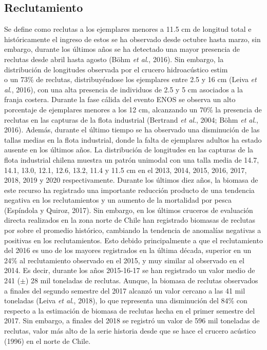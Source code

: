 \documentclass[letter,11pt]{article}
\begin{document}
\subsection{Reclutamiento}

Se define como reclutas a los ejemplares menores a 11.5 cm de longitud
total e hist\'oricamente el ingreso de estos se ha observado desde octubre
hasta marzo, sin embargo, durante los \'ultimos a\~{n}os se ha detectado una
mayor presencia de reclutas desde abril hasta agosto (B\"ohm
\textit{et al}., 2016). Sin embargo, la distribuci\'on de longitudes
observada por el crucero hidroac\'ustico estim\\o un 73\% de reclutas,
distribuy\'endose los ejemplares entre 2.5 y 16 cm (Leiva \textit{et al}.,
2016), con una alta presencia de individuos de 2.5 y 5 cm asociados a la
franja costera. Durante la fase c\'alida del evento ENOS se observa un
alto porcentaje de ejemplares menores a los 12 cm, alcanzando un 70\% la
presencia de reclutas en las capturas de la flota industrial (Bertrand
\textit{et al}., 2004; B\"ohm \textit{et al}., 2016). Adem\'as, durante el
\'ultimo tiempo se ha observado una disminuci\'on de las tallas medias en la
flota industrial, donde la falta de ejemplares adultos ha estado ausente
en los \'ultimos a\~{n}os. La distribuci\'on de longitudes en las capturas de la
flota industrial chilena muestra un patr\'on unimodal con una talla media
de 14.7, 14.1, 13.0, 12.1, 12.6, 13.2, 11.4 y 11.5 cm en el 2013, 2014,
2015, 2016, 2017, 2018, 2019 y 2020 respectivamente. Durante los \'ultimos
diez a\~{n}os, la biomasa de este recurso ha registrado una importante
reducci\'on producto de una tendencia negativa en los reclutamientos y un
aumento de la mortalidad por pesca (Esp\'indola y Quiroz, 2017). Sin
embargo, en los \'ultimos cruceros de evaluaci\'on directa realizados en la
zona norte de Chile han registrado biomasas de reclutas por sobre el
promedio hist\'orico, cambiando la tendencia de anomal\'ias negativas a
positivas en los reclutamientos. Esto debido principalmente a que el
reclutamiento del 2016 es uno de los mayores registrados en la \'ultima
d\'ecada, superior en un 24\% al reclutamiento observado en el 2015, y muy
similar al observado en el 2014. Es decir, durante los a\~{n}os 2015-16-17
se han registrado un valor medio de 241 ($\pm$) 28 mil toneladas de
reclutas. Aunque, la biomasa de reclutas observados a finales del
segundo semestre del 2017 alcanz\'o un valor cercano a las 41 mil
toneladas (Leiva \textit{et al}., 2018), lo que representa una
disminuci\'on del 84\% con respecto a la estimaci\'on de biomasa de reclutas
hecha en el primer semestre del 2017. Sin embargo, a finales del 2018 se
registr\'o un valor de 596 mil toneladas de reclutas, valor m\'as alto de la
serie historia desde que se hace el crucero ac\'ustico (1996) en el norte
de Chile.
\end{document}
